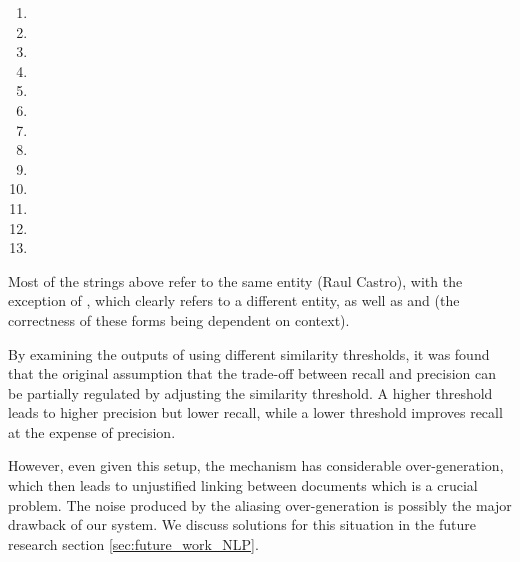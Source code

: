 \begin{enumerate}
 \item {}
 \item {}
 \item {}
 \item {}
 \item {}
 \item {}
 \item {}
 \item {}
 \item {}
 \item {}
 \item {}
 \item {}
 \item {}
\end{enumerate}

Most of the strings above refer to the same entity (Raul Castro), with the exception of , which clearly refers to a different entity, as well as  and  (the correctness of these forms being dependent on context).

By examining the outputs of using different similarity thresholds, it was found that the original assumption that the trade-off between recall and precision can be partially regulated by adjusting the similarity threshold. A higher threshold leads to higher precision but lower recall, while a lower threshold improves recall at the expense of precision.

However, even given this setup, the mechanism has considerable over-generation, which then leads to unjustified linking between documents which is a crucial problem. The noise produced by the aliasing over-generation is possibly the major drawback of our system. We discuss solutions for this situation in the future research section \ref{sec:future_work_NLP}.


